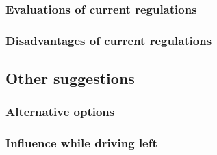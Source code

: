 \subsubsection{Evaluations of current regulations}

\subsubsection{Disadvantages of current regulations}

\subsection{Other suggestions}

\subsubsection{Alternative options}

\subsubsection{Influence while driving left}
